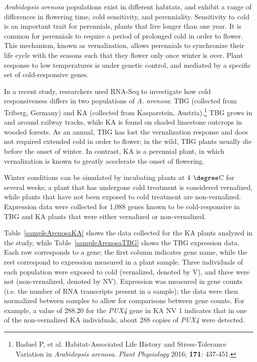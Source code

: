 \textit{Arabidopsis arenosa} populations exist in different habitats, and exhibit a range of differences in flowering time, cold sensitivity, and perenniality. Sensitivity to cold is an important trait for perennials, plants that live longer than one year. It is common for perennials to require a period of prolonged cold in order to flower. This mechanism, known as vernalization, allows perennials to synchronize their life cycle with the seasons such that they flower only once winter is over. Plant response to low temperatures is under genetic control, and mediated by a specific set of cold-responsive genes.

In a recent study, researchers used RNA-Seq to investigate how cold responsiveness differs in two populations of \textit{A. arenosa}: TBG (collected from Triberg, Germany) and KA (collected from Kasparstein, Austria).\footnote{Baduel P, et al. Habitat-Associated Life History and Stress-Tolerance Variation in \textit{Arabidopsis arenosa}. \textit{Plant Physiology} 2016; \textbf{171}: 437-451.} TBG grows in and around railway tracks, while KA is found on shaded limestone outcrops in wooded forests. As an annual, TBG has lost the vernalization response and does not required extended cold in order to flower; in the wild, TBG plants usually die before the onset of winter. In contrast, KA is a perennial plant, in which vernalization is known to greatly accelerate the onset of flowering.

Winter conditions can be simulated by incubating plants at 4 $\degree$C for several weeks; a plant that has undergone cold treatment is considered vernalized, while plants that have not been exposed to cold treatment are non-vernalized. Expression data were collected for 1,088 genes known to be cold-responsive in TBG and KA plants that were either vernalized or non-vernalized. 

Table~\ref{sampleArenosaKA} shows the data collected for the KA plants analyzed in the study, while Table~\ref{sampleArenosaTBG} shows the TBG expression data. Each row corresponds to a gene; the first column indicates gene name, while the rest correspond to expression measured in a plant sample. Three individuals of each population were exposed to cold (vernalized, denoted by V), and three were not (non-vernalized, denoted by NV). Expression was measured in gene counts (i.e. the number of RNA transcripts present in a sample); the data were then normalized between samples to allow for comparisons between gene counts. For example, a value of 288.20 for the \textit{PUX4} gene in KA NV 1 indicates that in one of the non-vernalized KA individuals, about 288 copies of \textit{PUX4} were detected.


